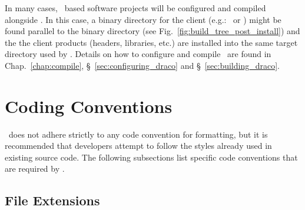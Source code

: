 In many cases, \draco\ based software projects will be configured and compiled alongside \draco.  In this case, a binary directory for the client (e.g.: \clubimc\ or \capsaicin) might be found parallel to the  binary directory (see Fig.~\ref{fig:build_tree_post_install}) and the the client products (headers, libraries, etc.) are installed into the same target directory used by \draco.  Details on how to configure and compile \draco\ are found in Chap.~\ref{chap:compile}, \S~\ref{sec:configuring_draco} and \S~\ref{sec:building_draco}.



\section{Coding Conventions}
\label{sec:codeconventions}

\draco\ does not adhere strictly to any code convention for formatting, but it is recommended that developers attempt to follow the styles already used in existing source code.  The following subsections list specific code conventions that are required by \draco.

\subsection{File Extensions}
\label{sec:cc-fileext}

